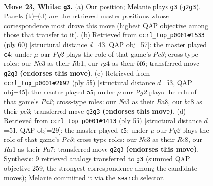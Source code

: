 \documentclass[11pt]{article}
\begin{document}
\clearpage

\begin{figure}[p]\centering
\begin{subfigure}{0.46\textwidth}\centering
\resizebox{\linewidth}{!}{%
\newchessgame
\chessboard[
  setfen={rnb1k3/5p2/1p2p3/p3P3/P5r1/2NB4/1P3PP1/R2R2K1 w q - 0 23},
  showmover=false,
  pgfstyle=straightmove, color=movearrow, markmove={g2-g3}
]}
\caption{}
\end{subfigure}\hfill
\begin{subfigure}{0.46\textwidth}\centering
\resizebox{\linewidth}{!}{%
\newchessgame
\chessboard[
  setfen={1r4k1/p4p2/4pb2/2rp2p1/P7/1PP3P1/4BP2/1RR3K1 w - - 0 31},
  showmover=false,
  pgfstyle=straightmove, color=movearrow, markmove={c3-c4}
]}
\caption{}
\end{subfigure}
\\[4pt]
\begin{subfigure}{0.46\textwidth}\centering
\resizebox{\linewidth}{!}{%
\newchessgame
\chessboard[
  setfen={r1r3k1/p4p2/6p1/7p/R1p1p3/2P1P1P1/5PP1/3R2K1 b - - 3 28},
  showmover=false,
  pgfstyle=straightmove, color=movearrow, markmove={a7-a5}
]}
\caption{}
\end{subfigure}\hfill
\begin{subfigure}{0.46\textwidth}\centering
\resizebox{\linewidth}{!}{%
\newchessgame
\chessboard[
  setfen={2r1r1k1/p5b1/2p3p1/7p/3p1B2/1P4PP/P1R2P1K/3R4 b - - 0 28},
  showmover=false,
  pgfstyle=straightmove, color=movearrow, markmove={c6-c5}
]}
\caption{}
\end{subfigure}
\caption{\textbf{Move 23, White: \texttt{g3}.} (a) Our position; Melanie plays \texttt{g3} (\texttt{g2g3}). Panels (b)--(d) are the retrieved master positions whose correspondence most drove this move (highest QAP objective among those that transfer to it). (b) Retrieved from \texttt{ccrl\_top\_p0001\#1533} (ply 60) [structural distance $d$=43, QAP obj=57]: the master played \texttt{c4}; under $\mu$ our \emph{Pg2} plays the role of that game's \emph{Pc3}; cross-type roles: our \emph{N}c3 as their \emph{R}b1, our \emph{r}g4 as their \emph{b}f6; transferred move \texttt{g2g3} \textbf{(endorses this move)}. (c) Retrieved from \texttt{ccrl\_top\_p0001\#2692} (ply 55) [structural distance $d$=53, QAP obj=45]: the master played \texttt{a5}; under $\mu$ our \emph{Pg2} plays the role of that game's \emph{Pa2}; cross-type roles: our \emph{N}c3 as their \emph{R}a8, our \emph{b}c8 as their \emph{p}c3; transferred move \texttt{g2g3} \textbf{(endorses this move)}. (d) Retrieved from \texttt{ccrl\_top\_p0001\#1413} (ply 55) [structural distance $d$=51, QAP obj=29]: the master played \texttt{c5}; under $\mu$ our \emph{Pg2} plays the role of that game's \emph{Pc3}; cross-type roles: our \emph{N}c3 as their \emph{R}c8, our \emph{R}a1 as their \emph{P}a7; transferred move \texttt{g2g3} \textbf{(endorses this move)}. Synthesis: 9 retrieved analogs transferred to \texttt{g3} (summed QAP objective 259, the strongest correspondence among the candidate moves); Melanie committed it via the \texttt{search} selector.}
\label{fig:thought-m44}
\end{figure}
\end{document}
